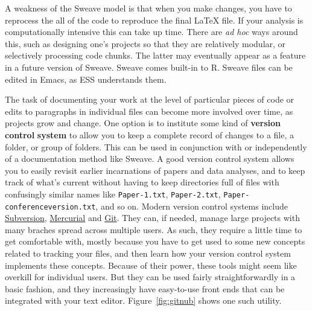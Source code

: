 \documentclass[11pt,article,oneside]{memoir}
\begin{document}
A weakness of the Sweave model is that when you make changes, you have to reprocess the all of the code to reproduce the final LaTeX file. If your analysis is computationally intensive this can take up time. There are \emph{ad hoc} ways around this, such as designing one's projects so that they are relatively modular, or selectively processing code chunks. The latter may eventually appear as a  feature in a future version of Sweave. Sweave comes built-in to R. Sweave files can be edited in Emacs, as ESS understands them.

\smallskip

The task of documenting your work at the level of particular pieces of code or edits to paragraphs in individual files can become more involved over time, as projects grow and change. One option is to institute some kind of \textbf{version} \textbf{control} \textbf{system} to allow you to keep a complete record of changes to a file, a folder, or group of folders. This can be used in conjunction with or independently of a documentation method like Sweave. A good version control system  allows you to easily revisit earlier incarnations of papers and data analyses, and to keep track of what's current without having to keep directories full of files with confusingly similar names like \texttt{Paper-1.txt}, \texttt{Paper-2.txt}, \texttt{Paper-conferenceversion.txt}, and so on. Modern version control systems include \href{http://subversion.tigris.org/}{Subversion}, \href{http://www.selenic.com/mercurial/}{Mercurial} and \href{http://git.or.cz/}{Git}. They can, if needed, manage large projects with many braches spread across multiple users. As such, they require a little time to get comfortable with, mostly because you have to get used to some new concepts related to tracking your files, and then learn how your version control system implements these concepts. Because of their power, these tools might seem like overkill for individual users. But they can be used fairly straightforwardly in a basic fashion, and they increasingly have easy-to-use front ends that can be integrated with your text editor. Figure~\ref{fig:gitnub} shows one such utility.     
\end{document}
